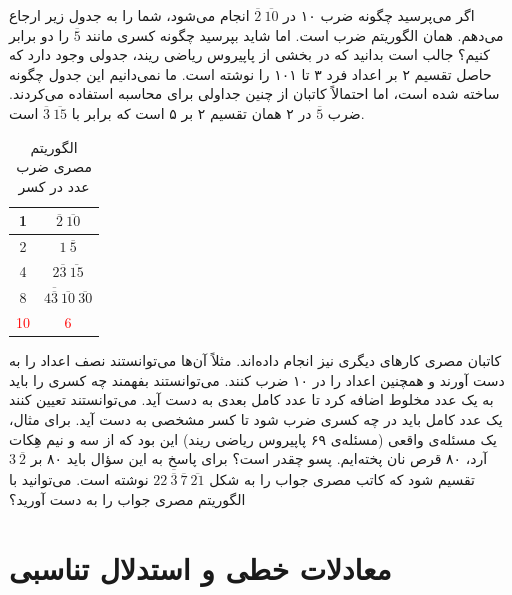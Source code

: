      اگر می‌پرسید چگونه ضرب ۱۰ در
     $\overline{2} \ \overline{10}$
     انجام می‌شود، شما را به جدول زیر ارجاع می‌دهم. همان الگوریتم ضرب است. اما شاید بپرسید چگونه کسری مانند $\overline{5}$ را دو برابر کنیم؟ جالب است بدانید که در بخشی از پاپیروس ریاضی ریند، جدولی وجود دارد که حاصل تقسیم ۲ بر اعداد فرد ۳ تا ۱۰۱ را نوشته است. ما نمی‌دانیم این جدول چگونه ساخته شده است، اما احتمالاً کاتبان از چنین جداولی برای محاسبه استفاده می‌کردند. ضرب $\overline{5}$ در ۲ همان تقسیم ۲ بر ۵ است که برابر با
     $\overline{3} \ \overline{15}$
     است.
    \begin{table}[H]
    	\centering
    	\caption{الگوریتم مصری ضرب عدد در کسر}
    	\label{table1.2}
    	\begin{latin}
    		\begin{tabular}{|c|c|}
    			\hline
    			1 & $\overline{2} \ \overline{10}$ \\
    			\hline
    			2 & $1 \ \overline{5}$ \\
    			\hline
    			4 & $2 \overline{3} \ \overline{15}$ \\
    			\hline
    			8 & $4 \overline{\overline{3}} \ \overline{10} \ \overline{30}$ \\
    			\hline
    			\textcolor{red}{10} & \textcolor{red}{6} \\
    			\hline
    		\end{tabular}
    	\end{latin}
    \end{table}
    
    کاتبان مصری کارهای دیگری نیز انجام داده‌اند. مثلاً آن‌ها می‌توانستند نصف اعداد را به دست آورند و همچنین اعداد را در ۱۰ ضرب کنند. می‌توانستند بفهمند چه کسری را باید به یک عدد مخلوط%
    اضافه کرد تا عدد کامل%
    بعدی به دست آید. می‌توانستند تعیین کنند یک عدد کامل باید در چه کسری ضرب شود تا کسر مشخصی به دست آید. برای مثال، یک مسئله‌ی واقعی (مسئله‌ی ۶۹ پاپیروس ریاضی ریند) این بود که از سه و نیم هِکات%
    آرد، ۸۰ قرص نان پخته‌ایم. پسو%
    چقدر است؟ برای پاسخ به این سؤال باید ۸۰ بر
    $3 \ \overline{2}$
    تقسیم شود که کاتب مصری جواب را به شکل
    $22 \ \overline{\overline{3}} \ \overline{7} \ \overline{21}$
    نوشته است. می‌توانید با الگوریتم مصری جواب را به دست آورید؟
\section{معادلات خطی و استدلال تناسبی}

